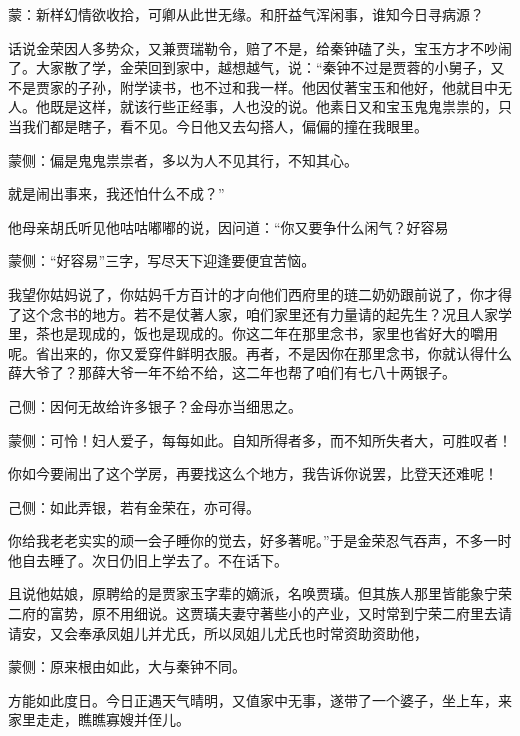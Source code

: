 

\begin{parag}
    \begin{note}蒙：新样幻情欲收拾，可卿从此世无缘。和肝益气浑闲事，谁知今日寻病源？\end{note}
\end{parag}


\begin{parag}
    话说金荣因人多势众，又兼贾瑞勒令，赔了不是，给秦钟磕了头，宝玉方才不吵闹了。大家散了学，金荣回到家中，越想越气，说：“秦钟不过是贾蓉的小舅子，又不是贾家的子孙，附学读书，也不过和我一样。他因仗著宝玉和他好，他就目中无人。他既是这样，就该行些正经事，人也没的说。他素日又和宝玉鬼鬼祟祟的，只当我们都是瞎子，看不见。今日他又去勾搭人，偏偏的撞在我眼里。\begin{note}蒙侧：偏是鬼鬼祟祟者，多以为人不见其行，不知其心。\end{note}就是闹出事来，我还怕什么不成？”
\end{parag}


\begin{parag}
    他母亲胡氏听见他咕咕嘟嘟的说，因问道：“你又要争什么闲气？好容易\begin{note}蒙侧：“好容易”三字，写尽天下迎逢要便宜苦恼。\end{note}我望你姑妈说了，你姑妈千方百计的才向他们西府里的琏二奶奶跟前说了，你才得了这个念书的地方。若不是仗著人家，咱们家里还有力量请的起先生？况且人家学里，茶也是现成的，饭也是现成的。你这二年在那里念书，家里也省好大的嚼用呢。省出来的，你又爱穿件鲜明衣服。再者，不是因你在那里念书，你就认得什么薛大爷了？那薛大爷一年不给不给，这二年也帮了咱们有七八十两银子。\begin{note}己侧：因何无故给许多银子？金母亦当细思之。\end{note}\begin{note}蒙侧：可怜！妇人爱子，每每如此。自知所得者多，而不知所失者大，可胜叹者！\end{note}你如今要闹出了这个学房，再要找这么个地方，我告诉你说罢，比登天还难呢！\begin{note}己侧：如此弄银，若有金荣在，亦可得。\end{note}你给我老老实实的顽一会子睡你的觉去，好多著呢。”于是金荣忍气吞声，不多一时他自去睡了。次日仍旧上学去了。不在话下。
\end{parag}


\begin{parag}
    且说他姑娘，原聘给的是贾家玉字辈的嫡派，名唤贾璜。但其族人那里皆能象宁荣二府的富势，原不用细说。这贾璜夫妻守著些小的产业，又时常到宁荣二府里去请请安，又会奉承凤姐儿并尤氏，所以凤姐儿尤氏也时常资助资助他，\begin{note}蒙侧：原来根由如此，大与秦钟不同。\end{note}方能如此度日。今日正遇天气晴明，又值家中无事，遂带了一个婆子，坐上车，来家里走走，瞧瞧寡嫂并侄儿。
\end{parag}


